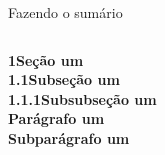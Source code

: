 \begin{frame}{Fazendo o sumário}
\begin{columns}
\begin{column}{0.5\linewidth}
{\begin{minipage}[c][0.8\textheight][t]{0.9\textwidth}
\begin{columns}
\begin{column}{0.8\textwidth}
                            \vspace{2em}
                            \fontsize{4.5}{4.75}\selectfont
                            \textbf{1\hspace{1em}Seção um}\\
                            \vspace{1em}
                            \fontsize{4}{4.25}\selectfont
                            \textbf{1.1\hspace{1em}Subseção um}\\
                            \vspace{1em}
                            \fontsize{3.5}{3.75}\selectfont
                            \textbf{1.1.1\hspace{1em}Subsubseção um}\\
                            \vspace{1em}
                            \fontsize{3.5}{3.75}\selectfont
                            \textbf{Parágrafo um}\\
                            \vspace{1.5em}
                            \fontsize{3.5}{3.75}\selectfont
                            \textbf{\hspace{2em}Subparágrafo um}\\
                        \end{column}
                    \end{columns}
            		\vfill
                    \fontsize{3.75}{4.5}
                    \vspace{0.1\textwidth}
        		\end{minipage}}
            \end{column}
        \end{columns}
    \end{frame}


